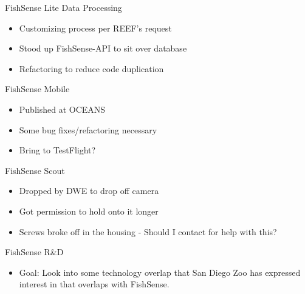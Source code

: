 \begin{frame}{FishSense Lite Data Processing}
    \begin{itemize}
        \item Customizing process per REEF's request
        \item Stood up FishSense-API to sit over database
        \item Refactoring to reduce code duplication
    \end{itemize}
\end{frame}

\begin{frame}{FishSense Mobile}
    \begin{itemize}
        \item Published at OCEANS
        \item Some bug fixes/refactoring necessary
        \item Bring to TestFlight?
    \end{itemize}
\end{frame}

\begin{frame}{FishSense Scout}
    \begin{itemize}
        \item Dropped by DWE to drop off camera
        \item Got permission to hold onto it longer
        \item Screws broke off in the housing - Should I contact for help with this?
    \end{itemize}
\end{frame}

\begin{frame}{FishSense R\&D}
    \begin{itemize}
        \item Goal: Look into some technology overlap that San Diego Zoo has expressed interest in that overlaps with FishSense.
    \end{itemize}
\end{frame}
